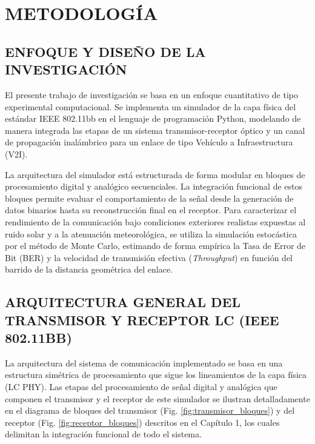 \chapter{METODOLOGÍA}

\section{ENFOQUE Y DISEÑO DE LA INVESTIGACIÓN}
El presente trabajo de investigación se basa en un enfoque cuantitativo de tipo experimental computacional. Se implementa un simulador de la capa física del estándar IEEE 802.11bb en el lenguaje de programación Python, modelando de manera integrada las etapas de un sistema transmisor-receptor óptico y un canal de propagación inalámbrico para un enlace de tipo Vehículo a Infraestructura (V2I).

La arquitectura del simulador está estructurada de forma modular en bloques de procesamiento digital y analógico secuenciales. La integración funcional de estos bloques permite evaluar el comportamiento de la señal desde la generación de datos binarios hasta su reconstrucción final en el receptor. Para caracterizar el rendimiento de la comunicación bajo condiciones exteriores realistas expuestas al ruido solar y a la atenuación meteorológica, se utiliza la simulación estocástica por el método de Monte Carlo, estimando de forma empírica la Tasa de Error de Bit (BER) y la velocidad de transmisión efectiva (\textit{Throughput}) en función del barrido de la distancia geométrica del enlace.


\section{ARQUITECTURA GENERAL DEL TRANSMISOR Y RECEPTOR LC (IEEE 802.11BB)}
La arquitectura del sistema de comunicación implementado se basa en una estructura simétrica de procesamiento que sigue los lineamientos de la capa física (LC PHY). Las etapas del procesamiento de señal digital y analógica que componen el transmisor y el receptor de este simulador se ilustran detalladamente en el diagrama de bloques del transmisor (Fig. \ref{fig:transmisor_bloques}) y del receptor (Fig. \ref{fig:receptor_bloques}) descritos en el Capítulo 1, los cuales delimitan la integración funcional de todo el sistema.

